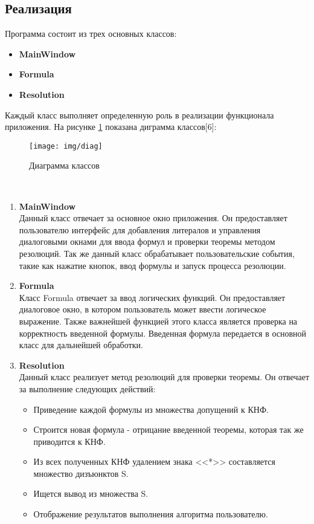 \documentclass[12pt, a4paper]{article}
\begin{document}
	 \begin{center}
	 	\subsection{Реализация}
	 \end{center} 
	 \par Программа состоит из трех основных классов: 
	 \begin{itemize}
	 	\item \textbf{MainWindow}
	 	\item \textbf{Formula}
	 	\item \textbf{Resolution}
	 \end{itemize}
	 \par Каждый класс выполняет определенную роль в реализации функционала приложения. На рисунке \ref{fig:diag} показана диграмма классов[6]:
	 \begin{figure}[h!]
	 	\centering
	 	\texttt{[image: img/diag]}
	 	\caption{Диаграмма классов}
	 	\label{fig:diag}
	 \end{figure}\\
	 \begin{enumerate}
	 	\item \textbf{MainWindow}\\
	 	Данный класс отвечает за основное окно приложения. Он предоставляет пользователю интерфейс для добавления литералов и управления диалоговыми окнами для ввода формул и проверки теоремы методом резолюций. Так же данный класс обрабатывает пользовательские события, такие как нажатие кнопок, ввод формулы и запуск процесса резолюции.
	 	\item \textbf{Formula}\\
	 	Класс Formula отвечает за ввод логических функций. Он предоставляет диалоговое окно, в котором пользователь может ввести логическое выражение. Также важнейшей функцией этого класса является проверка на корректность введенной формулы. Введенная формула передается в основной класс для дальнейшей обработки.
	 	\item \textbf{Resolution}\\
	 	Данный класс реализует метод резолюций для проверки теоремы. Он отвечает за выполнение следующих действий:
	 	\begin{itemize}
	 		\item Приведение каждой формулы из множества допущений к КНФ.
	 		\item Строится новая формула - отрицание введенной теоремы, которая так же приводится к КНФ.
	 		\item Из всех полученных КНФ удалением знака <<*>> составляется множество дизъюнктов S.
	 		\item Ищется вывод из множества S.
	 		\item Отображение результатов выполнения алгоритма пользователю.
	 	\end{itemize}
	 \end{enumerate}
\end{document}
